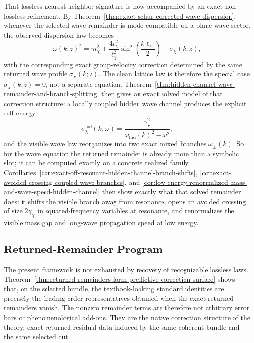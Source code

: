 That lossless nearest-neighbor signature is now accompanied by an exact
non-lossless refinement. By
Theorem~\ref{thm:exact-schur-corrected-wave-dispersion}, whenever the selected
wave remainder is mode-compatible on a plane-wave sector, the observed
dispersion law becomes
\[
\omega(k;z)^2
=
m_{\chi}^2
+
\frac{4c_{\chi}^2}{\ell_{\chi}^2}
\sin^2\!\left(\frac{k\ell_{\chi}}{2}\right)
-
\sigma_{\chi}(k;z),
\]
with the corresponding exact group-velocity correction determined by the same
returned wave profile \(\sigma_{\chi}(k;z)\). The clean lattice law is
therefore the special case \(\sigma_{\chi}(k;z)=0\), not a separate equation.
Theorem~\ref{thm:hidden-channel-wave-remainder-and-branch-splitting} then gives
an exact solved model of that correction structure: a locally coupled
hidden wave channel produces the explicit self-energy
\[
\sigma_{\chi}^{\mathrm{hid}}(k,\omega)
=
\frac{\gamma_{\chi}^2}{\omega_{\mathrm{hid}}(k)^2-\omega^2},
\]
and the visible wave law reorganizes into two exact mixed branches
\(\omega_{\pm}(k)\). So for the wave equation the returned remainder is already
more than a symbolic slot; it can be computed exactly on a concrete realized
family. Corollaries~\ref{cor:exact-off-resonant-hidden-channel-branch-shifts},
\ref{cor:exact-avoided-crossing-coupled-wave-branches}, and
\ref{cor:low-energy-renormalized-mass-and-wave-speed-hidden-channel} then show
exactly what that solved remainder does: it shifts the visible branch away
from resonance, opens an avoided crossing of size \(2\gamma_{\chi}\) in
squared-frequency variables at resonance, and renormalizes the visible mass
gap and long-wave propagation speed at low energy.

\subsection{Returned-Remainder Program}

The present framework is not exhausted by recovery of recognizable lossless
laws. Theorem~\ref{thm:returned-remainders-form-predictive-correction-surface}
shows that, on the selected bundle, the textbook-looking standard identities
are precisely the leading-order representatives obtained when the exact
returned remainders vanish. The nonzero remainder terms are therefore not
arbitrary error bars or phenomenological add-ons. They are the native
correction structure of the theory: exact returned-residual data induced by the
same coherent bundle and the same selected cut.

